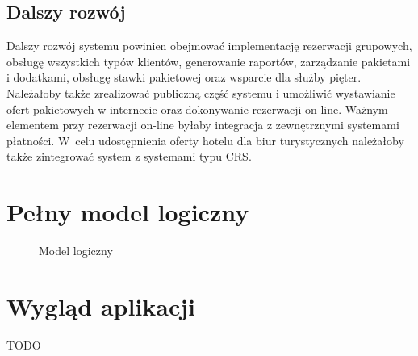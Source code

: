 \documentclass[a4paper,onecolumn,oneside,11pt,wide,floatssmall]{mwrep}
\theoremstyle{definition}
\theoremstyle{plain}%
\theoremstyle{remark}
\begin{document}
\section{Dalszy rozwój}
Dalszy rozwój systemu powinien obejmować implementację rezerwacji grupowych, obsługę wszystkich typów klientów, generowanie raportów, zarządzanie pakietami i dodatkami, obsługę stawki pakietowej oraz wsparcie dla służby pięter. Należałoby także zrealizować publiczną część systemu i umożliwić wystawianie ofert pakietowych w internecie oraz dokonywanie rezerwacji on-line. Ważnym elementem przy rezerwacji on-line byłaby integracja z zewnętrznymi systemami płatności. \mbox{W celu} udostępnienia oferty hotelu dla biur turystycznych należałoby także zintegrować system z systemami typu CRS.


\appendix


\chapter{Pełny model logiczny}
\label{dodatek-model-logiczny}
\begin{figure}[H]
  \begin{center}
  \end{center}
  \caption{Model logiczny}
  \label{fig:db-logical-model-full}
\end{figure}

\chapter{Wygląd aplikacji}
TODO


\nocite{*}


% 

\end{document}
